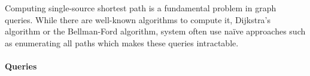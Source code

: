 
Computing single-source shortest path is a fundamental problem in graph queries.
While there are well-known algorithms to compute it, \eg Dijkstra's algorithm or
the Bellman-Ford algorithm, system often use na\"ive approaches such as
enumerating all paths which makes these queries intractable.


\paragraph{Queries}
{\raggedright
}